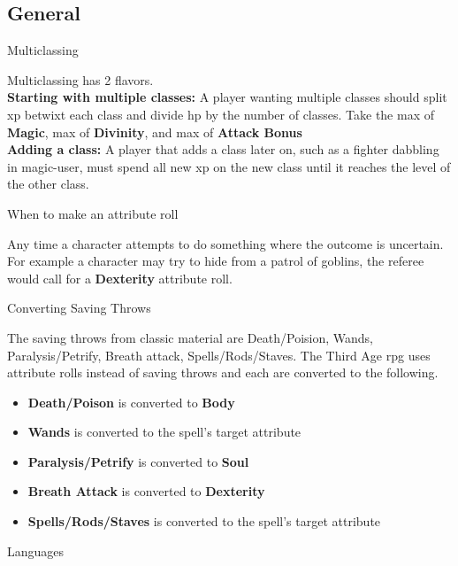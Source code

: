 \begin{multicols}{2}
\section*{General} %
\begin{mercHeading}
Multiclassing
\end{mercHeading}
Multiclassing has 2 flavors.\\
\textbf{Starting with multiple classes:} A player wanting multiple classes should split xp betwixt each class and divide hp by the number of classes. Take the max of \textbf{Magic}, max of \textbf{Divinity}, and max of \textbf{Attack Bonus} \\
\textbf{Adding a class:} A player that adds a class later on, such as a fighter dabbling in magic-user, must spend all new xp on the new class until it reaches the level of the other class.
\begin{mercHeading}
When to make an attribute roll
\end{mercHeading}
Any time a character attempts to do something where the outcome is uncertain. For example a character may try to hide from a patrol of goblins, the referee would call for a \textbf{Dexterity} attribute roll.
\begin{mercHeading}
Converting Saving Throws
\end{mercHeading}
The saving throws from classic material are Death/Poision, Wands, Paralysis/Petrify, Breath attack, Spells/Rods/Staves. The Third Age rpg uses attribute rolls instead of saving throws and each are converted to the following.
\begin{itemize}
\setlength\itemsep{0em}
	\item \textbf{Death/Poison} is converted to \textbf{Body}
	\item \textbf{Wands} is converted to the spell's target attribute
	\item \textbf{Paralysis/Petrify} is converted to \textbf{Soul}
	\item \textbf{Breath Attack} is converted to \textbf{Dexterity}
	\item \textbf{Spells/Rods/Staves} is converted to the spell's target attribute
\end{itemize}


\begin{mercHeading}
Languages
\end{mercHeading}


\end{multicols}
